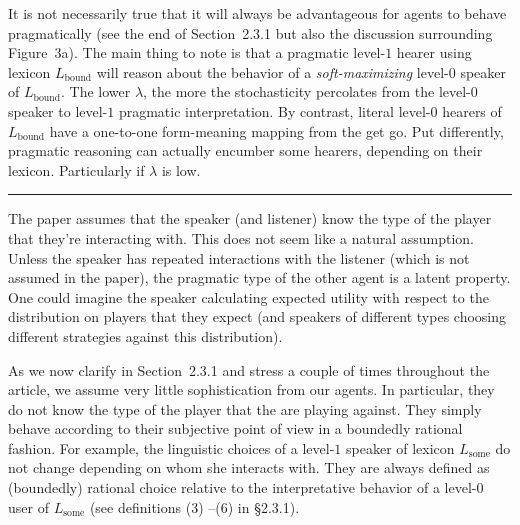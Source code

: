 \documentclass[12pt,a4paper]{article}
\begin{document}
It is not necessarily true that it will always be advantageous for agents to behave pragmatically (see the end of Section~2.3.1 but also the discussion surrounding Figure~3a).  The main thing to note is that a pragmatic level-$1$ hearer using lexicon $L_{\text{bound}}$ will reason about the behavior of a {\em soft-maximizing} level-$0$ speaker of $L_{\text{bound}}$. The lower $\lambda$, the more the stochasticity percolates from the level-$0$ speaker to level-$1$ pragmatic interpretation. By contrast, literal level-$0$ hearers of $L_{\text{bound}}$ have a one-to-one form-meaning mapping from the get go. Put differently, pragmatic reasoning can actually encumber some hearers, depending on their lexicon. Particularly if $\lambda$ is low.


%
\vspace{0.5cm}

\noindent\rule{\textwidth}{1pt}

\begin{mdframed}[backgroundcolor=gray!25,linecolor=gray!25,frametitle= Reviewer \thereviewerCounter~comment \thereviewerCommentCounter \hfill ~~({\it agent simplicity})]
%
The paper assumes that the speaker (and listener) know the type of the player that they're interacting with. This does not seem like a natural assumption. Unless the speaker has repeated interactions with the listener (which is not assumed in the paper), the pragmatic type of the other agent is a latent property. One could imagine the speaker calculating expected utility with respect to the distribution on players that they expect (and speakers of different types choosing different strategies against this distribution). 

%
\end{mdframed}

As we now clarify in Section~2.3.1 and stress a couple of times throughout the article, we assume very little sophistication from our agents. In particular, they do not know the type of the player that the are playing against. They simply behave according to their subjective point of view in a boundedly rational fashion. For example, the linguistic choices of a level-$1$ speaker of lexicon $L_{\text{some}}$ do not change depending on whom she interacts with. They are always defined as (boundedly) rational choice relative to the interpretative behavior of a level-$0$ user of $L_{\text{some}}$ (see definitions (3) --(6) in \S2.3.1).
%

\vspace{0.5cm}
\end{document}

